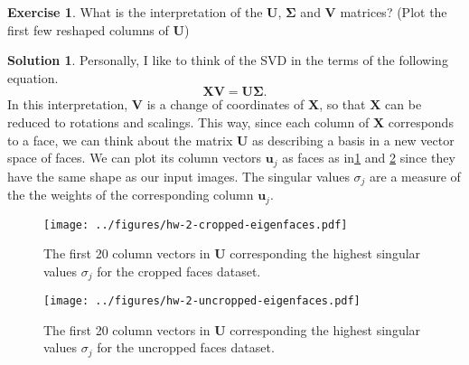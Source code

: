 \documentclass[12pt]{article}
\renewcommand{\vec}[1]{\mathbf{#1}}
\theoremstyle{definition}
\newtheorem{exer}{Exercise}
\newtheorem{sol}{Solution}
\theoremstyle{remark}
\begin{document}
\begin{exer}
    What is the interpretation of the $\vec{U}$, $\vec{\Sigma}$ and $\vec{V}$ matrices? (Plot the first few reshaped columns of $\vec{U}$)
\end{exer}
\begin{sol}
    Personally, I like to think of the SVD in the terms of the following equation.
    \begin{equation}
        \vec{XV} = \vec{U}\vec{\Sigma}.
    \end{equation}
    In this interpretation, $\vec{V}$ is a change of coordinates of $\vec{X}$, so that $\vec{X}$ can be reduced to rotations and scalings. This way, since each column of $\vec{X}$ corresponds to a face, we can think about the matrix $\vec{U}$ as describing a basis in a new vector space of faces. We can plot its column vectors $\vec{u}_j$ as faces as in\cref{fig:cropped_eigenfaces} and \cref{fig:uncropped_eigenfaces} since they have the same shape as our input images. The singular values $\sigma_j$ are a measure of the the weights of the corresponding column $\vec{u}_j$.
    \begin{figure}[h]
        \centering
        \texttt{[image: ../figures/hw-2-cropped-eigenfaces.pdf]}
        \caption{The first 20 column vectors in $\vec{U}$ corresponding the highest singular values $\sigma_j$ for the cropped faces dataset. }
        \label{fig:cropped_eigenfaces}
    \end{figure}

    \begin{figure}[h]
        \centering
        \texttt{[image: ../figures/hw-2-uncropped-eigenfaces.pdf]}
        \caption{The first 20 column vectors in $\vec{U}$ corresponding the highest singular values $\sigma_j$ for the uncropped faces dataset. }
        \label{fig:uncropped_eigenfaces}
    \end{figure}
\end{sol}

\newpage
\end{document}
